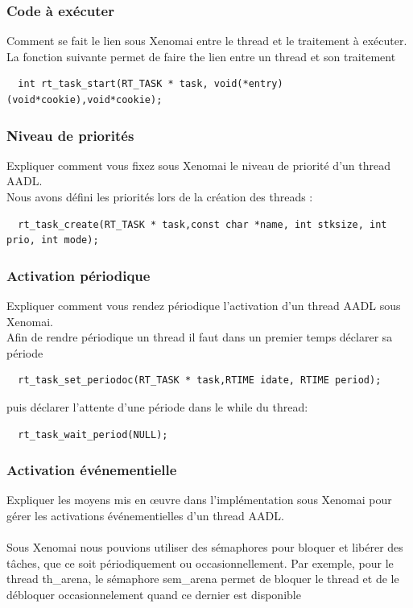 \documentclass[11pt, a4paper]{paper}
\begin{document}
{{{%
\subsubsection{Code à exécuter}
 {\color{blue} Comment se fait le lien sous Xenomai entre le thread et le traitement à exécuter.}\\
 
 {\color{black} La fonction suivante permet de faire the lien entre un thread et son traitement}
\begin{verbatim}
  int rt_task_start(RT_TASK * task, void(*entry)(void*cookie),void*cookie);
\end{verbatim}
 

\subsubsection{Niveau de priorités}
 {\color{blue} Expliquer comment vous fixez sous Xenomai le niveau de priorité d'un thread AADL.}\\
 
{\color{black} Nous avons défini les priorités lors de la création des threads : }
\begin{verbatim}
  rt_task_create(RT_TASK * task,const char *name, int stksize, int prio, int mode);
\end{verbatim}

\subsubsection{Activation périodique}
 {\color{blue} Expliquer comment vous rendez périodique l'activation d'un thread AADL sous Xenomai.}\\
 
{\color{black} Afin de rendre périodique un thread il faut dans un premier temps déclarer sa période}
\begin{verbatim}
  rt_task_set_periodoc(RT_TASK * task,RTIME idate, RTIME period);
\end{verbatim}
{\color{black} puis déclarer l'attente d'une période dans le while du thread:}
\begin{verbatim}
  rt_task_wait_period(NULL);
\end{verbatim}

\subsubsection{Activation événementielle}
 {\color{blue} Expliquer les moyens mis en {\oe}uvre dans l'implémentation sous Xenomai pour gérer les activations événementielles d'un thread AADL.}\\ \\
{\color{black} Sous Xenomai nous pouvions utiliser des sémaphores pour bloquer et libérer des tâches, que ce soit périodiquement ou occasionnellement. Par exemple, pour le thread th\_arena, le sémaphore sem\_arena permet de bloquer le thread et de le débloquer occasionnelement quand ce dernier est disponible}
 
}}}
\end{document}
